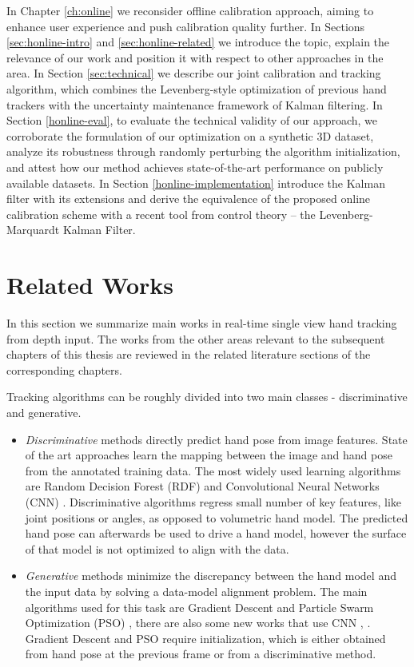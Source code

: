 In Chapter \ref{ch:online} we reconsider offline calibration approach, aiming to enhance user experience and push calibration quality further. In Sections \ref{sec:honline-intro} and \ref{sec:honline-related} we introduce the topic, explain the relevance of our work and position it with respect to other approaches in the area. In Section \ref{sec:technical} we describe our joint calibration and tracking algorithm, which combines the Levenberg-style optimization of previous hand trackers with the uncertainty maintenance framework of Kalman filtering. In Section \ref{honline-eval}, to evaluate the technical validity of our approach, we corroborate the formulation of our optimization on a synthetic 3D dataset, analyze its robustness through randomly perturbing the algorithm initialization, and attest how our method achieves state-of-the-art performance on publicly available datasets. In Section \ref{honline-implementation} introduce the Kalman filter with its extensions and derive the equivalence of the proposed online calibration scheme with a recent tool from control theory – the Levenberg-Marquardt Kalman Filter.

\section{Related Works}

In this section we summarize main works in real-time single view hand tracking from depth input. The works from the other areas relevant to the subsequent chapters of this thesis are reviewed in the related literature sections of the corresponding chapters. 

Tracking algorithms can be roughly divided into two main classes - discriminative and generative.
\vspace{-1.5em}
\begin{itemize}
\item \textit{Discriminative} methods directly predict hand pose from image features. State of the art approaches learn the mapping between the image and hand pose from the annotated training data. The most widely used learning algorithms are Random Decision Forest (RDF) \cite{keskin2012hand} and Convolutional Neural Networks (CNN) \cite{tompson2014real}. Discriminative algorithms regress small number of key features, like joint positions or angles, as opposed to volumetric hand model. The predicted hand pose can afterwards be used to drive a hand model, however the surface of that model is not optimized to align with the data. 
%
\item \textit{Generative} methods minimize the discrepancy between the hand model and the input data by solving a data-model alignment problem. The main algorithms used for this task are Gradient Descent \cite{taylor2016concerto} and Particle Swarm Optimization (PSO) \cite{oiko2011hand}, there are also some new works that use CNN \cite{simon2017hand}, \cite{zimmermann2017learning}. Gradient Descent and PSO require initialization, which is either obtained from hand pose at the previous frame or from a discriminative method.
\end{itemize}

